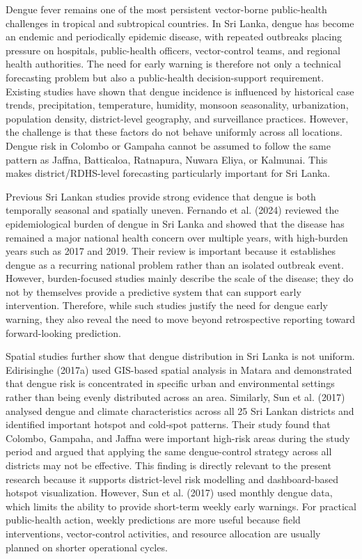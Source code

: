 \documentclass[12pt,a4paper]{article}
\begin{document}
Dengue fever remains one of the most persistent vector-borne public-health challenges in tropical and subtropical countries. In Sri Lanka, dengue has become an endemic and periodically epidemic disease, with repeated outbreaks placing pressure on hospitals, public-health officers, vector-control teams, and regional health authorities. The need for early warning is therefore not only a technical forecasting problem but also a public-health decision-support requirement. Existing studies have shown that dengue incidence is influenced by historical case trends, precipitation, temperature, humidity, monsoon seasonality, urbanization, population density, district-level geography, and surveillance practices. However, the challenge is that these factors do not behave uniformly across all locations. Dengue risk in Colombo or Gampaha cannot be assumed to follow the same pattern as Jaffna, Batticaloa, Ratnapura, Nuwara Eliya, or Kalmunai. This makes district/RDHS-level forecasting particularly important for Sri Lanka.

Previous Sri Lankan studies provide strong evidence that dengue is both temporally seasonal and spatially uneven. Fernando et al. (2024) reviewed the epidemiological burden of dengue in Sri Lanka and showed that the disease has remained a major national health concern over multiple years, with high-burden years such as 2017 and 2019. Their review is important because it establishes dengue as a recurring national problem rather than an isolated outbreak event. However, burden-focused studies mainly describe the scale of the disease; they do not by themselves provide a predictive system that can support early intervention. Therefore, while such studies justify the need for dengue early warning, they also reveal the need to move beyond retrospective reporting toward forward-looking prediction.

Spatial studies further show that dengue distribution in Sri Lanka is not uniform. Edirisinghe (2017a) used GIS-based spatial analysis in Matara and demonstrated that dengue risk is concentrated in specific urban and environmental settings rather than being evenly distributed across an area. Similarly, Sun et al. (2017) analysed dengue and climate characteristics across all 25 Sri Lankan districts and identified important hotspot and cold-spot patterns. Their study found that Colombo, Gampaha, and Jaffna were important high-risk areas during the study period and argued that applying the same dengue-control strategy across all districts may not be effective. This finding is directly relevant to the present research because it supports district-level risk modelling and dashboard-based hotspot visualization. However, Sun et al. (2017) used monthly dengue data, which limits the ability to provide short-term weekly early warnings. For practical public-health action, weekly predictions are more useful because field interventions, vector-control activities, and resource allocation are usually planned on shorter operational cycles.
\end{document}

